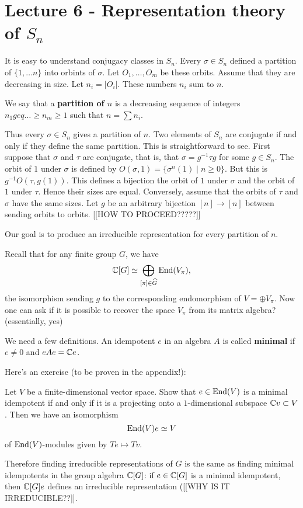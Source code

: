 \documentclass[11pt, english]{article}
\begin{document}
\section{Lecture 6 - Representation theory of $S_n$}

It is easy to understand conjugacy classes in $S_n$. Every $\sigma \in S_n$ defined a partition of $\{ 1,\ldots n\}$ into orbints of $\sigma$. Let $O_1,\ldots,O_m$ be these orbits. Assume that they are decreasing in size. Let $n_i=\lvert O_i \rvert$. These numbers $n_i$ sum to $n$.

We say that a \textbf{partition of $n$} is a decreasing sequence of integers $n_1 geq \ldots \geq n_m \geq 1$ such that $n=\sum n_i$. 

Thus every $\sigma \in S_n$ gives a partition of $n$. Two elements of $S_n$ are conjugate if and only if they define the same partition. This is straightforward to see. First suppose that $\sigma$ and $\tau$ are conjugate, that is, that $\sigma = g^{-1} \tau g$ for some $g \in S_n$. The orbit of $1$ under $\sigma$ is defined by $O(\sigma,1) = \{ \sigma^n(1) \mid n \geq 0 \}$. But this is $g^{-1} O(\tau, g(1))$. This defines a bijection the orbit of $1$ under $\sigma$ and the orbit of $1$ under $\tau$. Hence their sizes are equal. Conversely, assume that the orbits of $\tau$ and $\sigma$ have the same sizes. Let $g$ be an arbitrary bijection $[n] \to [n]$ between sending orbits to orbits. [[HOW TO PROCEED?????]]

Our goal is to produce an irreducible representation for every partition of $n$.

Recall that for any finite group $G$, we have
$$
\mathbb{C} [G] \simeq \bigoplus_{[\pi] \in \widehat G} \operatorname{End}(V_\pi),
$$
the isomorphism sending $g$ to the corresponding endomorphism of $V = \oplus V_\pi$. Now one can ask if it is possible to recover the space $V_\pi$ from its matrix algebra? (essentially, yes)

We need a few definitions. An idempotent $e$ in an algebra $A$ is called \textbf{minimal} if $e \neq 0$ and $eAe =\mathbb{C} e$. 

Here's an exercise (to be proven in the appendix!):
\begin{exc}
 Let $V$ be a finite-dimensional vector space. Show that $e \in \operatorname{End}(V)$ is a minimal idempotent if and only if it is a projecting onto a $1$-dimensional subspace $\mathbb{C} v \subset V$. Then we have an isomorphism
$$
\operatorname{End}(V)e \simeq V
$$
of $\operatorname{End}(V)$-modules given by $Te \mapsto Tv$. 
\end{exc}
Therefore finding irreducible representations of $G$ is the same as finding minimal idempotents in the group algebra $\mathbb{C}[G]$: if $e \in \mathbb{C}[G]$ is a minimal idempotent, then $\mathbb{C}[G]e$ defines an irreducible representation ([[WHY IS IT IRREDUCIBLE??]].
\end{document}

